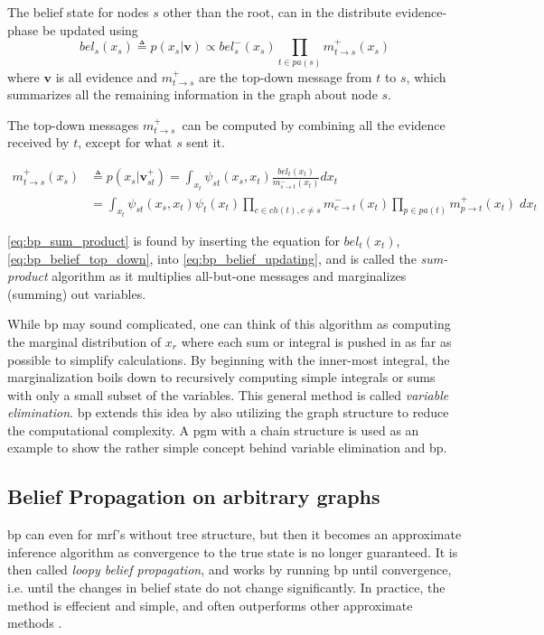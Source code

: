 The belief state for nodes $s$ other than the root, can in the distribute evidence-phase be updated using
\begin{equation}\label{eq:bp_belief_top_down}
    bel_s(x_s) \triangleq p(x_s | \mathbf{v}) \propto bel_s^-(x_s) \prod_{t \in pa(s)} m_{t \to s}^+(x_s)
\end{equation}
where $\mathbf{v}$ is all evidence and $m_{t \to s}^+$ are the top-down message from $t$ to $s$, which summarizes all the remaining information in the graph about node $s$. 

The top-down messages $m_{t \to s}^+$ can be computed by combining all the evidence received by $t$, except for what $s$ sent it.

\begin{subequations}
\begin{align}
    m_{t \to s}^+(x_s) &\triangleq p(x_s | \mathbf{v}_{st}^+) = \int_{x_t}\psi_{st}(x_s, x_t)\frac{bel_t(x_t)}{m_{s \to t}^-(x_t)}dx_t \label{eq:bp_belief_updating}\\
    &= \int_{x_t} \psi_{st}(x_s, x_t)\psi_t(x_t) \prod_{c \in ch(t), c \neq s} m_{c \to t}^-(x_t) \prod_{p \in pa(t)} m_{p \to t}^+(x_t) \; dx_t\label{eq:bp_sum_product}
\end{align}
\end{subequations}

\cref{eq:bp_sum_product} is found by inserting the equation for $bel_t(x_t)$, \cref{eq:bp_belief_top_down}, into \cref{eq:bp_belief_updating}, and is called the \textit{sum-product} algorithm as it multiplies all-but-one messages and marginalizes (summing) out variables. 

While \acrshort{bp} may sound complicated, one can think of this algorithm as computing the marginal distribution of $x_r$ where each sum or integral is pushed in as far as possible to simplify calculations. By beginning with the inner-most integral, the marginalization boils down to recursively computing simple integrals or sums with only a small subset of the variables. This general method is called \textit{variable elimination}\cite{murphy}. \acrshort{bp} extends this idea by also utilizing the graph structure to reduce the computational complexity. A \acrshort{pgm} with a chain structure is used as an example to show the rather simple concept behind variable elimination and \acrshort{bp}.

\subsection{Belief Propagation on arbitrary graphs}
\acrshort{bp} can even for \acrshort{mrf}'s without tree structure, but then it becomes an approximate inference algorithm as convergence to the true state is no longer guaranteed. It is then called \textit{loopy belief propagation}, and works by running \acrshort{bp} until convergence, i.e. until the changes in belief state do not change significantly.  In practice, the method is effecient and simple, and often outperforms other approximate methods \cite{murphy}.

